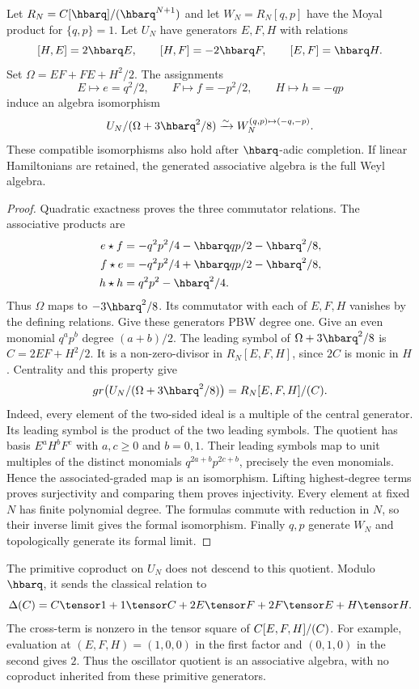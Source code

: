 \begin{proposition}\label{prop:vol2-oscillator-quotient}
Let $R_N=\C[\hbarq]/(\hbarq^{N+1})$ and let $W_N=R_N[q,p]$
have the Moyal product for $\{q,p\}=1$.
Let $U_N$ have generators $E,F,H$ with relations
\[
 [H,E]=2\hbarq E,\qquad [H,F]=-2\hbarq F,\qquad [E,F]=\hbarq H.
\]
Set $\Omega=EF+FE+H^2/2$.
The assignments
\[
 E\longmapsto e=q^2/2,\qquad
 F\longmapsto f=-p^2/2,\qquad
 H\longmapsto h=-qp
\]
induce an algebra isomorphism
\[
 U_N/(\Omega+3\hbarq^2/8)
 \xrightarrow{\sim} W_N^{(q,p)\mapsto(-q,-p)}.
\]
These compatible isomorphisms also hold after $\hbarq$-adic completion.
If linear Hamiltonians are retained, the generated associative algebra is the full Weyl algebra.
\end{proposition}
\begin{proof}
Quadratic exactness proves the three commutator relations.
The associative products are
\[
\begin{split}
 e\star f&=-q^2p^2/4-\hbarq qp/2-\hbarq^2/8,\\
 f\star e&=-q^2p^2/4+\hbarq qp/2-\hbarq^2/8,\\
 h\star h&=q^2p^2-\hbarq^2/4.
\end{split}
\]
Thus $\Omega$ maps to $-3\hbarq^2/8$.
Its commutator with each of $E,F,H$ vanishes by the defining relations.
Give these generators PBW degree one.
Give an even monomial $q^ap^b$ degree $(a+b)/2$.
The leading symbol of $\Omega+3\hbarq^2/8$ is
$C=2EF+H^2/2$.
It is a non-zero-divisor in $R_N[E,F,H]$, since $2C$ is monic in $H$.
Centrality and this property give
\[
 \operatorname{gr}\bigl(U_N/(\Omega+3\hbarq^2/8)\bigr)
 =R_N[E,F,H]/(C).
\]
Indeed, every element of the two-sided ideal is a multiple of the central generator.
Its leading symbol is the product of the two leading symbols.
The quotient has basis $E^aH^bF^c$ with $a,c\ge0$ and $b=0,1$.
Their leading symbols map to unit multiples of the distinct monomials
$q^{2a+b}p^{2c+b}$, precisely the even monomials.
Hence the associated-graded map is an isomorphism.
Lifting highest-degree terms proves surjectivity and comparing them proves injectivity.
Every element at fixed $N$ has finite polynomial degree.
The formulas commute with reduction in $N$, so their inverse limit gives the formal isomorphism.
Finally $q,p$ generate $W_N$ and topologically generate its formal limit.
\end{proof}

The primitive coproduct on $U_N$ does not descend to this quotient.
Modulo $\hbarq$, it sends the classical relation to
\[
 \Delta(C)=C\tensor1+1\tensor C
   +2E\tensor F+2F\tensor E+H\tensor H.
\]
The cross-term is nonzero in the tensor square of $C[E,F,H]/(C)$.
For example, evaluation at $(E,F,H)=(1,0,0)$ in the first factor
and $(0,1,0)$ in the second gives $2$.
Thus the oscillator quotient is an associative algebra, with no coproduct inherited from these primitive generators.

